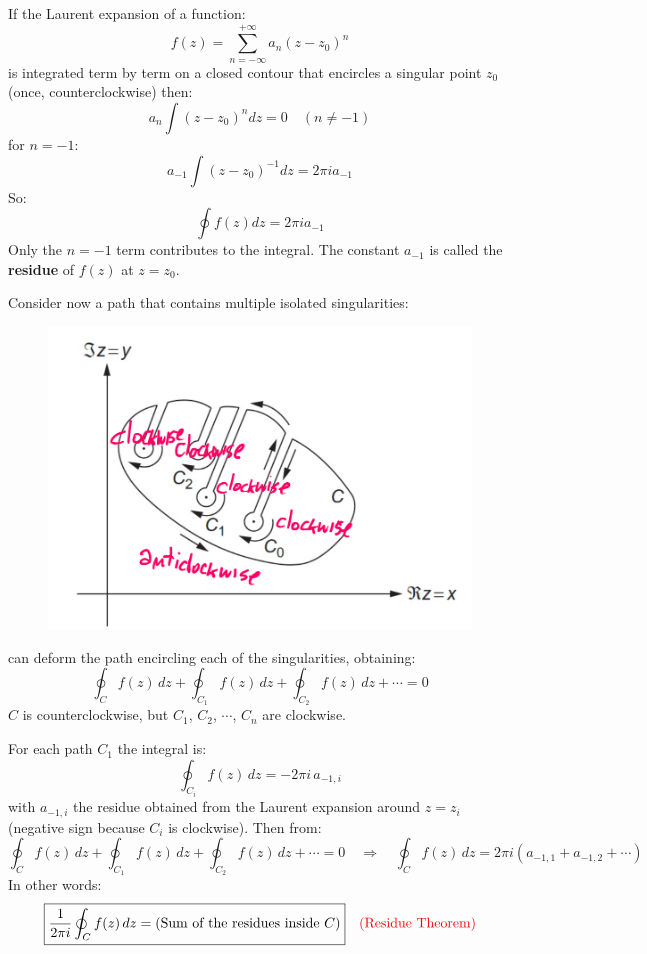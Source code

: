 \documentclass{article}
\begin{document}
\noindent
If the Laurent expansion of a function:
\begin{equation}
    f(z) = \sum_{n = -\infty}^{+\infty} a_n (z-z_0)^n
\end{equation}
is integrated term by term on a closed contour that encircles a singular point $z_0$ (once, counterclockwise) then:
\begin{equation}
    a_n \int (z-z_0)^n dz = 0 \quad (n \neq -1)
\end{equation}
for $n=-1$:
\begin{equation}
    a_{-1} \int (z-z_0)^{-1} dz = 2\pi i a _{-1}
\end{equation}
So:
\begin{equation}
    \oint f(z)dz = 2\pi i a_{-1}
\end{equation}
Only the $n=-1$ term contributes to the integral. \color{red} The constant $a_{-1}$ is called the \textbf{residue} of $f(z)$ at $z=z_0$. \color{black}

\noindent
Consider now a path that contains multiple isolated singularities:

\begin{figure}[h]
    \centering
    \includegraphics[width=0.5\linewidth]{fig30.png}
\end{figure}

\noindent
can deform the path encircling each of the singularities, obtaining:
\begin{equation}
    \oint_C f(z)\,dz + \oint_{C_1} f(z)\,dz + \oint_{C_2} f(z)\,dz + \cdots = 0
\end{equation}
$C$ is counterclockwise, but $C_1$, $C_2$, $\cdots$, $C_n$ are clockwise.

\newpage

\noindent
For each path $C_1$ the integral is:
\begin{equation}
    \oint_{C_i} f(z)\,dz = -2\pi i\, a_{-1,i}
\end{equation}
with $a_{-1,i}$ the residue obtained from the Laurent expansion around $z=z_i$ (negative sign because $C_i$ is clockwise). Then from:
\begin{equation}
    \oint_C f(z)\,dz + \oint_{C_1} f(z)\,dz + \oint_{C_2} f(z)\,dz + \cdots = 0 \quad \Rightarrow \quad  \oint_C f(z)\,dz = 2\pi i \left( a_{-1,1} + a_{-1,2} + \cdots \right)
\end{equation}
In other words:
\begin{equation}
    \boxed{\frac{1}{2\pi i} \oint_C f(z)\,dz = \text{(Sum of the residues inside $C$})} \quad \color{red} \text{(Residue Theorem)} \color{black}
\end{equation}
\end{document}
